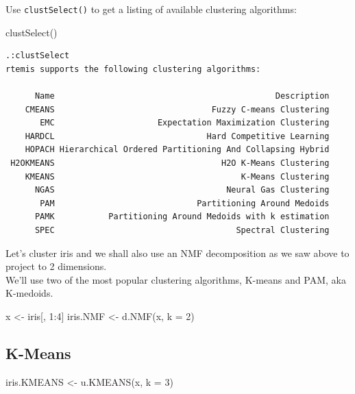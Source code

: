 \documentclass[
]{book}
\newenvironment{Shaded}{\begin{snugshade}}{\end{snugshade}}
\newcommand{\AttributeTok}[1]{\textcolor[rgb]{0.77,0.63,0.00}{#1}}
\newcommand{\DecValTok}[1]{\textcolor[rgb]{0.00,0.00,0.81}{#1}}
\newcommand{\FunctionTok}[1]{\textcolor[rgb]{0.00,0.00,0.00}{#1}}
\newcommand{\NormalTok}[1]{#1}
\newcommand{\OtherTok}[1]{\textcolor[rgb]{0.56,0.35,0.01}{#1}}
\newcommand{\SpecialCharTok}[1]{\textcolor[rgb]{0.00,0.00,0.00}{#1}}
\begin{document}
Use \texttt{clustSelect()} to get a listing of available clustering algorithms:

\begin{Shaded}
\begin{Highlighting}[]
\FunctionTok{clustSelect}\NormalTok{()}
\end{Highlighting}
\end{Shaded}

\begin{verbatim}
.:clustSelect
rtemis supports the following clustering algorithms:

      Name                                             Description
    CMEANS                                Fuzzy C-means Clustering
       EMC                     Expectation Maximization Clustering
    HARDCL                               Hard Competitive Learning
    HOPACH Hierarchical Ordered Partitioning And Collapsing Hybrid
 H2OKMEANS                                  H2O K-Means Clustering
    KMEANS                                      K-Means Clustering
      NGAS                                   Neural Gas Clustering
       PAM                             Partitioning Around Medoids
      PAMK           Partitioning Around Medoids with k estimation
      SPEC                                     Spectral Clustering
\end{verbatim}

Let's cluster iris and we shall also use an NMF decomposition as we saw above to project to 2 dimensions.\\
We'll use two of the most popular clustering algorithms, K-means and PAM, aka K-medoids.

\begin{Shaded}
\begin{Highlighting}[]
\NormalTok{x }\OtherTok{\textless{}{-}}\NormalTok{ iris[, }\DecValTok{1}\SpecialCharTok{:}\DecValTok{4}\NormalTok{]}
\NormalTok{iris.NMF }\OtherTok{\textless{}{-}} \FunctionTok{d.NMF}\NormalTok{(x, }\AttributeTok{k =} \DecValTok{2}\NormalTok{)}
\end{Highlighting}
\end{Shaded}

\hypertarget{k-means}{%
\subsection{K-Means}\label{k-means}}

\begin{Shaded}
\begin{Highlighting}[]
\NormalTok{iris.KMEANS }\OtherTok{\textless{}{-}} \FunctionTok{u.KMEANS}\NormalTok{(x, }\AttributeTok{k =} \DecValTok{3}\NormalTok{)}
\end{Highlighting}
\end{Shaded}
\end{document}
